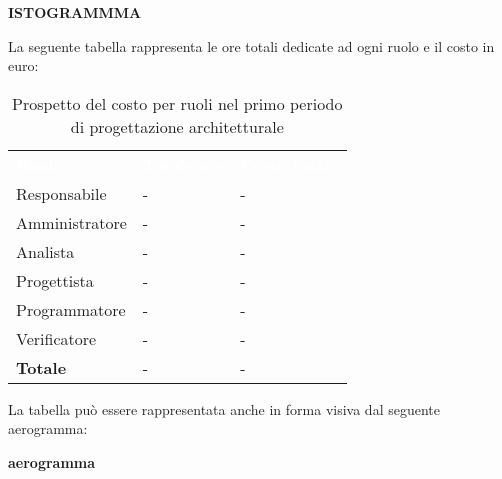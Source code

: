 \textbf{ISTOGRAMMMA}


La seguente tabella rappresenta le ore totali dedicate ad ogni ruolo e il costo in euro:

\begin{table}[!htbp]
\begin{center}
\renewcommand{\arraystretch}{1.5}
\begin{tabular}{ m{}<{\centering}  m{}<{\centering} m{}<{\centering}}
	\rowcolor{darkblue}
	\textcolor{white}{\textbf{Ruolo}}&\textcolor{white}{\textbf{Totale ore}}&\textcolor{white}{\textbf{Costo totale}}\\ 

	Responsabile  & - & - \\	

	Amministratore & - & - \\
	
	Analista & - & - \\
	
	Progettista & - & - \\
	
	Programmatore & - & - \\
	
	Verificatore & - & - \\
	
	\textbf{Totale} & - & - \\
	
\end{tabular}
\caption{Prospetto del costo per ruoli nel primo periodo di progettazione architetturale}
\end{center}
\end{table}

\noindent La tabella può essere rappresentata anche in forma visiva dal seguente aerogramma:

\textbf{aerogramma}


